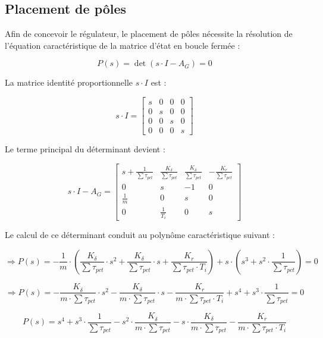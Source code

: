 \subsection{Placement de pôles}
Afin de concevoir le régulateur, le placement de pôles nécessite la résolution de l'équation caractéristique de la matrice d'état en boucle fermée :

\begin{equation}
    P(s) = \det(s \cdot I - A_G) = 0
\end{equation}

La matrice identité proportionnelle $s \cdot I$ est :

\begin{equation}
    s \cdot I = \begin{bmatrix} s & 0 & 0 & 0 \\ 0 & s & 0 & 0 \\ 0 & 0 & s & 0 \\ 0 & 0 & 0 & s \end{bmatrix}
\end{equation}

Le terme principal du déterminant devient :

\begin{equation}
    s \cdot I - A_G = \begin{bmatrix} s + \frac{1}{\sum\tau_{pct}} & \frac{K_\delta}{\sum\tau_{pct}} & \frac{K_{\dot{\delta}}}{\sum\tau_{pct}} & -\frac{K_r}{\sum\tau_{pct}} \\ 0 & s & -1 & 0 \\ \frac{1}{m} & 0 & s & 0 \\ 0 & \frac{1}{T_i} & 0 & s \end{bmatrix}
\end{equation}

Le calcul de ce déterminant conduit au polynôme caractéristique suivant :

$$\Rightarrow P(s) = -\frac{1}{m} \cdot \left( \frac{K_{\dot{\delta}}}{\sum\tau_{pct}} \cdot s^2 + \frac{K_\delta}{\sum\tau_{pct}} \cdot s + \frac{K_r}{\sum\tau_{pct} \cdot T_i} \right) + s \cdot \left( s^3 + s^2 \cdot \frac{1}{\sum\tau_{pct}} \right) = 0$$

$$ \Rightarrow P(s) = -\frac{K_{\dot{\delta}}}{m \cdot \sum\tau_{pct}} \cdot s^2 - \frac{K_\delta}{m \cdot \sum\tau_{pct}} \cdot s - \frac{K_r}{m \cdot \sum\tau_{pct} \cdot T_i} + s^4 + s^3 \cdot \frac{1}{\sum\tau_{pct}} = 0$$

\begin{equation}
    P(s) = s^4 + s^3 \cdot \frac{1}{\sum\tau_{pct}} - s^2 \cdot \frac{K_{\dot{\delta}}}{m \cdot \sum\tau_{pct}} - s \cdot \frac{K_\delta}{m \cdot \sum\tau_{pct}} - \frac{K_r}{m \cdot \sum\tau_{pct} \cdot T_i}
\end{equation}

